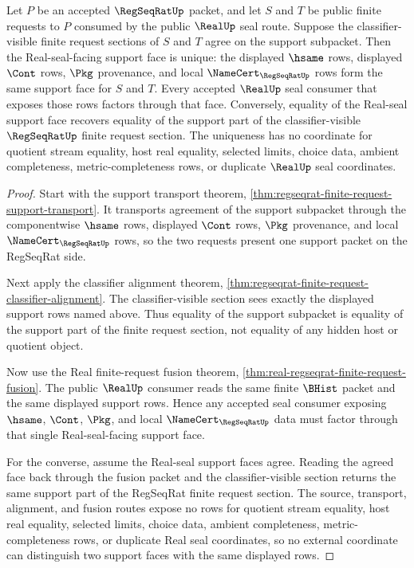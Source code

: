 \begin{theorem}
\label{thm:regseqrat-real-seal-support-face-uniqueness}
Let $P$ be an accepted $\RegSeqRatUp$ packet, and let $S$ and $T$ be public
finite requests to $P$ consumed by the public $\RealUp$ seal route. Suppose the
classifier-visible finite request sections of $S$ and $T$ agree on the support
subpacket. Then the Real-seal-facing support face is unique: the displayed
$\hsame$ rows, displayed $\Cont$ rows, $\Pkg$ provenance, and local
$\NameCert_{\RegSeqRatUp}$ rows form the same support face for $S$ and $T$.
Every accepted $\RealUp$ seal consumer that exposes those rows factors through
that face. Conversely, equality of the Real-seal support face recovers equality
of the support part of the classifier-visible $\RegSeqRatUp$ finite request
section. The uniqueness has no coordinate for quotient stream equality, host
real equality, selected limits, choice data, ambient completeness,
metric-completeness rows, or duplicate $\RealUp$ seal coordinates.
\end{theorem}
\begin{proof}
Start with the support transport theorem,
\autoref{thm:regseqrat-finite-request-support-transport}. It transports
agreement of the support subpacket through the componentwise $\hsame$ rows,
displayed $\Cont$ rows, $\Pkg$ provenance, and local
$\NameCert_{\RegSeqRatUp}$ rows, so the two requests present one support packet
on the RegSeqRat side.

Next apply the classifier alignment theorem,
\autoref{thm:regseqrat-finite-request-classifier-alignment}. The
classifier-visible section sees exactly the displayed support rows named above.
Thus equality of the support subpacket is equality of the support part of the
finite request section, not equality of any hidden host or quotient object.

Now use the Real finite-request fusion theorem,
\autoref{thm:real-regseqrat-finite-request-fusion}. The public $\RealUp$
consumer reads the same finite $\BHist$ packet and the same displayed support
rows. Hence any accepted seal consumer exposing $\hsame$, $\Cont$, $\Pkg$, and
local $\NameCert_{\RegSeqRatUp}$ data must factor through that single
Real-seal-facing support face.

For the converse, assume the Real-seal support faces agree. Reading the agreed
face back through the fusion packet and the classifier-visible section returns
the same support part of the RegSeqRat finite request section. The source,
transport, alignment, and fusion routes expose no rows for quotient stream
equality, host real equality, selected limits, choice data, ambient
completeness, metric-completeness rows, or duplicate Real seal coordinates, so
no external coordinate can distinguish two support faces with the same displayed
rows.
\end{proof}

